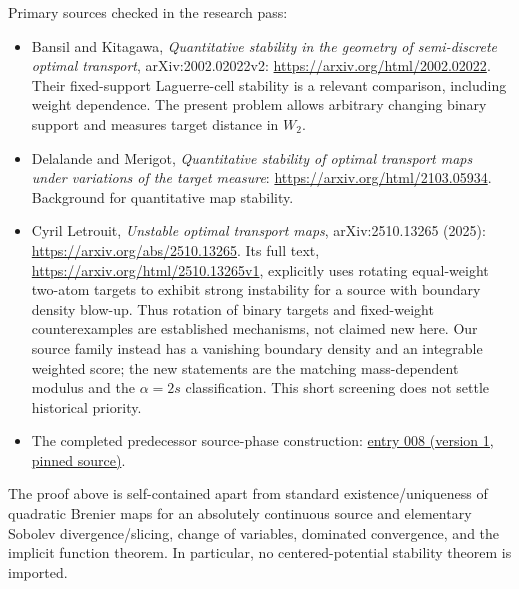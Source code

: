 \begingroup\small
Primary sources checked in the research pass:
\begin{itemize}[itemsep=2pt,topsep=3pt]
  \item Bansil and Kitagawa, \emph{Quantitative stability in the geometry of semi-discrete optimal transport}, arXiv:2002.02022v2: \url{https://arxiv.org/html/2002.02022}. Their fixed-support Laguerre-cell stability is a relevant comparison, including weight dependence. The present problem allows arbitrary changing binary support and measures target distance in $W_2$.
  \item Delalande and Merigot, \emph{Quantitative stability of optimal transport maps under variations of the target measure}: \url{https://arxiv.org/html/2103.05934}. Background for quantitative map stability.
  \item Cyril Letrouit, \emph{Unstable optimal transport maps}, arXiv:2510.13265 (2025): \url{https://arxiv.org/abs/2510.13265}. Its full text, \url{https://arxiv.org/html/2510.13265v1}, explicitly uses rotating equal-weight two-atom targets to exhibit strong instability for a source with boundary density blow-up. Thus rotation of binary targets and fixed-weight counterexamples are established mechanisms, not claimed new here. Our source family instead has a vanishing boundary density and an integrable weighted score; the new statements are the matching mass-dependent modulus and the $\alpha=2s$ classification. This short screening does not settle historical priority.
  \item The completed predecessor source-phase construction: \href{https://github.com/mxym/math/blob/c2281bc871c9bf60994985d6665ae45f4711d080/preprints/008-density-overlap-phase/v1/main.tex}{entry 008 (version 1, pinned source)}.
\end{itemize}
The proof above is self-contained apart from standard existence/uniqueness of quadratic Brenier maps for an absolutely continuous source and elementary Sobolev divergence/slicing, change of variables, dominated convergence, and the implicit function theorem. In particular, no centered-potential stability theorem is imported.
\par\endgroup
